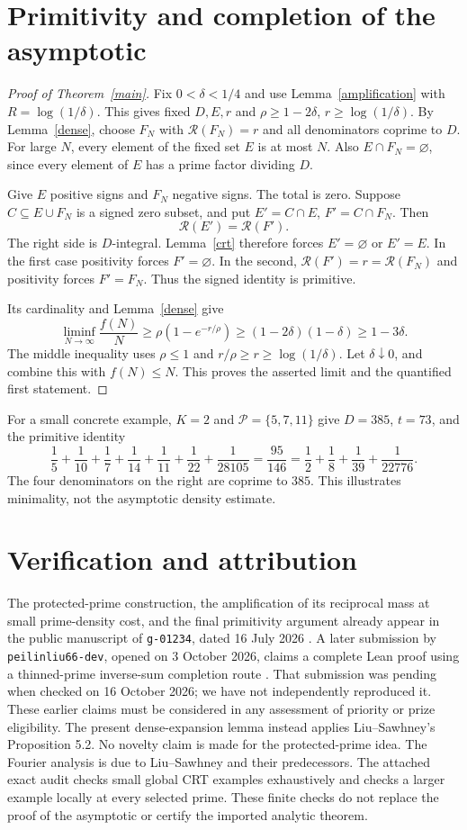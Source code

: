 \documentclass[11pt]{article}
\newcommand{\R}{\mathcal R}
\begin{document}
\section{Primitivity and completion of the asymptotic}
\begin{proof}[Proof of Theorem~\ref{main}]
Fix $0<\delta<1/4$ and use Lemma~\ref{amplification} with
$R=\log(1/\delta)$. This gives fixed $D,E,r$ and
$\rho\ge1-2\delta$, $r\ge\log(1/\delta)$.
By Lemma~\ref{dense}, choose $F_N$ with $\R(F_N)=r$ and all
denominators coprime to $D$. For large $N$, every element of the fixed
set $E$ is at most $N$. Also $E\cap F_N=\varnothing$, since every
element of $E$ has a prime factor dividing $D$.

Give $E$ positive signs and $F_N$ negative signs. The total is zero.
Suppose $C\subseteq E\cup F_N$ is a signed zero subset, and put
$E'=C\cap E$, $F'=C\cap F_N$. Then
\[
 \R(E')=\R(F').
\]
The right side is $D$-integral. Lemma~\ref{crt} therefore forces
$E'=\varnothing$ or $E'=E$.
In the first case positivity forces $F'=\varnothing$.
In the second, $\R(F')=r=\R(F_N)$ and positivity forces $F'=F_N$.
Thus the signed identity is primitive.

Its cardinality and Lemma~\ref{dense} give
\[
 \liminf_{N\to\infty}\frac{f(N)}N
 \ge\rho(1-e^{-r/\rho})
 \ge(1-2\delta)(1-\delta)\ge1-3\delta.
\]
The middle inequality uses $\rho\le1$ and
$r/\rho\ge r\ge\log(1/\delta)$.
Let $\delta\downarrow0$, and combine this with $f(N)\le N$.
This proves the asserted limit and the quantified first statement.
\end{proof}

For a small concrete example, $K=2$ and $\mathcal P=\{5,7,11\}$ give
$D=385$, $t=73$, and the primitive identity
\[
 \frac15+\frac1{10}+\frac17+\frac1{14}+\frac1{11}+\frac1{22}
 +\frac1{28105}
 =\frac{95}{146}
 =\frac12+\frac18+\frac1{39}+\frac1{22776}.
\]
The four denominators on the right are coprime to $385$.
This illustrates minimality, not the asymptotic density estimate.

\section{Verification and attribution}
The protected-prime construction, the amplification of its reciprocal
mass at small prime-density cost, and the final primitivity argument
already appear in the public manuscript of \texttt{g-01234}, dated
16 July 2026 \cite{g01234}. A later submission by
\texttt{peilinliu66-dev}, opened on 3 October 2026, claims a complete
Lean proof using a thinned-prime inverse-sum completion route
\cite{peilinliu}. That submission was pending when checked on
16 October 2026; we have not independently reproduced it. These earlier
claims must be considered in any assessment of priority or prize eligibility.
The present dense-expansion lemma instead applies Liu--Sawhney's
Proposition 5.2. No novelty claim is made for the protected-prime idea.
The Fourier analysis is due to Liu--Sawhney and their predecessors.
The attached exact audit checks small global CRT examples exhaustively
and checks a larger example locally at every selected prime. These
finite checks do not replace the proof of the asymptotic or certify
the imported analytic theorem.
\end{document}
